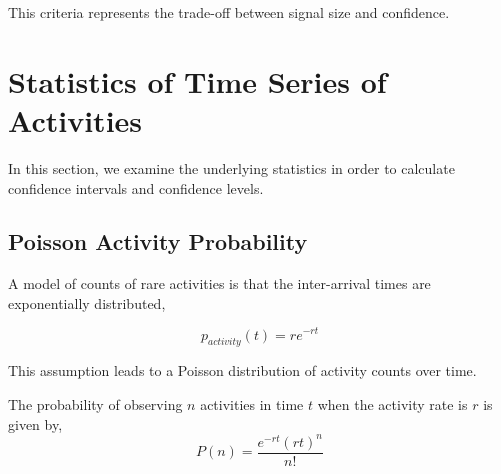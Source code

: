 \documentclass{article}
\begin{document}
This criteria represents the trade-off between signal size and confidence.

\section{Statistics of Time Series of Activities} 

In this section, we examine the underlying statistics in order to calculate confidence intervals and confidence levels.

\subsection{Poisson Activity Probability} 

A
\reversemarginpar\marginpar{\raggedleft
%
    \begin{tikzpicture}[scale=0.26]]
\draw [red, very thick, rotate around={60: (0, 0)}] (-0.7, -0.7) rectangle(0.7, 0.7);
%
\draw [very thick, <->] (0.25000000000000006, 0.4330127018922193) -- (1.25, 2.165063509461097) ;
\draw [very thick, <->] (1.75, 2.165063509461097) -- (2.75, 0.4330127018922193) ;
\draw [very thick, <->] (2.5, 0) -- (0.5, 0) ;
%
\draw [orange, ultra thick] (0,0) circle [radius= 0.5 ];
\draw [yellow, ultra thick] ( 1.5 , 2.59807621135 ) circle [radius= 0.5 ];
\draw [green,  ultra thick] ( 3.0 , 0 ) circle [radius= 0.5 ];
    \end{tikzpicture}
%
%
}
model of counts of rare activities is that the inter-arrival times are exponentially distributed, 

\begin{equation}
    \label{eq:tbe}
    p_{activity}(t) = r e^{-r t}
\end{equation}

This assumption leads to a Poisson distribution of activity counts over time.

The probability of observing $n$ activities in time $t$ when the activity rate is $r$ is given by,
\begin{equation}
    \label{eq:poisson}
    P(n) = \frac{e^{-r t} (r t)^n}{n!}
\end{equation}
\end{document}
